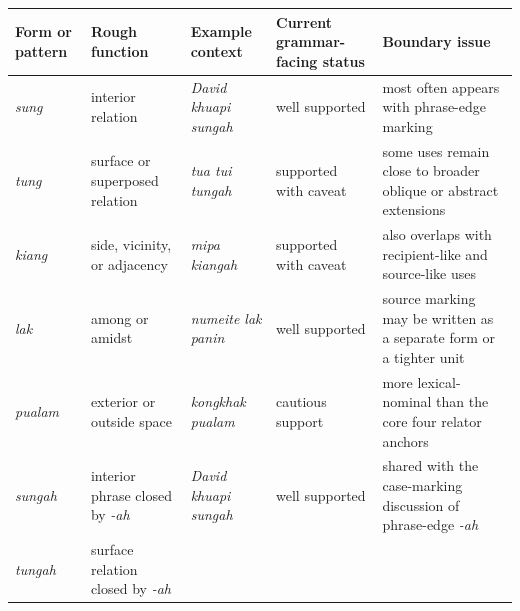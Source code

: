 \documentclass[
  11pt,
  a4paper,
]{article}
\newcounter{none} %
\newcommand{\tdim}[1]{\textit{#1}}
\begin{document}
{\def\LTcaptype{none} %
\begin{longtable}[]{@{}
  >{\raggedright\arraybackslash}p{}
  >{\raggedright\arraybackslash}p{}
  >{\raggedright\arraybackslash}p{}
  >{\raggedright\arraybackslash}p{}
  >{\raggedright\arraybackslash}p{}@{}}
\toprule\noalign{}
\begin{minipage}[b]{\linewidth}\raggedright
Form or pattern
\end{minipage} & \begin{minipage}[b]{\linewidth}\raggedright
Rough function
\end{minipage} & \begin{minipage}[b]{\linewidth}\raggedright
Example context
\end{minipage} & \begin{minipage}[b]{\linewidth}\raggedright
Current grammar-facing status
\end{minipage} & \begin{minipage}[b]{\linewidth}\raggedright
Boundary issue
\end{minipage} \\
\midrule\noalign{}
\endhead
\bottomrule\noalign{}
\endlastfoot
\tdim{sung} & interior relation & \tdim{David khuapi sungah} & well
supported & most often appears with phrase-edge marking \\
\tdim{tung} & surface or superposed relation & \tdim{tua tui tungah} &
supported with caveat & some uses remain close to broader oblique or
abstract extensions \\
\tdim{kiang} & side, vicinity, or adjacency & \tdim{mipa kiangah} &
supported with caveat & also overlaps with recipient-like and
source-like uses \\
\tdim{lak} & among or amidst & \tdim{numeite lak panin} & well supported
& source marking may be written as a separate form or a tighter unit \\
\tdim{pualam} & exterior or outside space & \tdim{kongkhak pualam} &
cautious support & more lexical-nominal than the core four relator
anchors \\
\tdim{sungah} & interior phrase closed by \tdim{-ah} &
\tdim{David khuapi sungah} & well supported & shared with the
case-marking discussion of phrase-edge \tdim{-ah} \\
\tdim{tungah} & surface relation closed by \tdim{-ah} &

\end{longtable}}
\end{document}
